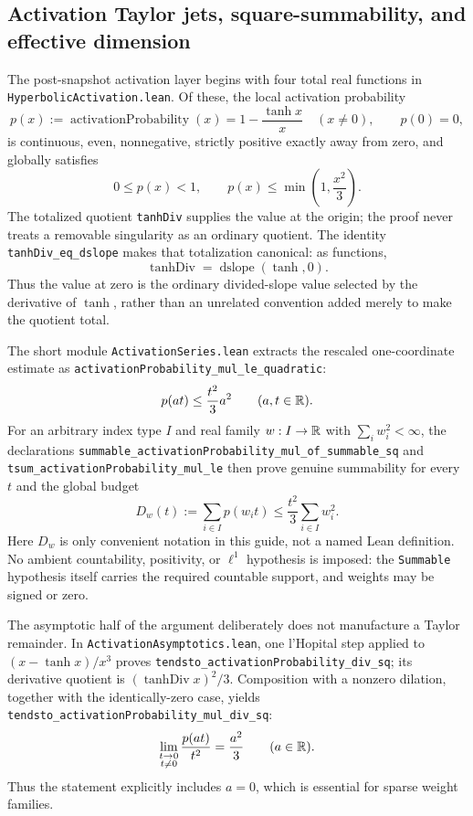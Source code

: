 \documentclass[11pt,oneside]{article}
\theoremstyle{definition}
\theoremstyle{remark}
\begin{document}
\subsection{Activation Taylor jets, square-summability, and effective dimension}
The post-snapshot activation layer begins with four total real functions in
\nolinkurl{HyperbolicActivation.lean}.  Of these, the local activation
probability
\[
 p(x):=\operatorname{activationProbability}(x)
 =1-\frac{\tanh x}{x}\quad(x\ne0),\qquad p(0)=0,
\]
is continuous, even, nonnegative, strictly positive exactly away from zero,
and globally satisfies
\[
 0\le p(x)<1,
 \qquad
 p(x)\le\min\left(1,\frac{x^2}{3}\right).
\]
The totalized quotient \nolinkurl{tanhDiv} supplies the value at the origin;
the proof never treats a removable singularity as an ordinary quotient.
The identity \nolinkurl{tanhDiv_eq_dslope} makes that totalization canonical:
as functions,
\[
 \operatorname{tanhDiv}
 = \operatorname{dslope}(\tanh,0).
\]
Thus the value at zero is the ordinary divided-slope value selected by the
derivative of \(\tanh\), rather than an unrelated convention added merely to
make the quotient total.

The short module \nolinkurl{ActivationSeries.lean} extracts the rescaled
one-coordinate estimate as
\nolinkurl{activationProbability_mul_le_quadratic}:
\[
 p(at)\le \frac{t^2}{3}a^2\qquad(a,t\in\mathbb{R}).
\]
For an arbitrary index type \(I\) and real family \(w:I\to\mathbb{R}\) with
\(\sum_i w_i^2<\infty\), the declarations
\nolinkurl{summable_activationProbability_mul_of_summable_sq} and
\nolinkurl{tsum_activationProbability_mul_le} then prove genuine summability
for every \(t\) and the global budget
\[
 D_w(t):=\sum_{i\in I}p(w_it)
 \le \frac{t^2}{3}\sum_{i\in I}w_i^2.
\]
Here \(D_w\) is only convenient notation in this guide, not a named Lean
definition.  No ambient countability, positivity, or \(\ell^1\) hypothesis is
imposed: the \nolinkurl{Summable} hypothesis itself carries the required
countable support, and weights may be signed or zero.

The asymptotic half of the argument deliberately does not manufacture a
Taylor remainder.  In \nolinkurl{ActivationAsymptotics.lean}, one
l'Hopital step applied to
\((x-\tanh x)/x^3\) proves
\nolinkurl{tendsto_activationProbability_div_sq}; its derivative quotient is
\((\operatorname{tanhDiv}x)^2/3\).  Composition with a nonzero dilation,
together with the identically-zero case, yields
\nolinkurl{tendsto_activationProbability_mul_div_sq}:
\[
 \lim_{\substack{t\to0\\t\ne0}}\frac{p(at)}{t^2}=\frac{a^2}{3}
 \qquad(a\in\mathbb{R}).
\]
Thus the statement explicitly includes \(a=0\), which is essential for sparse
weight families.
\end{document}
